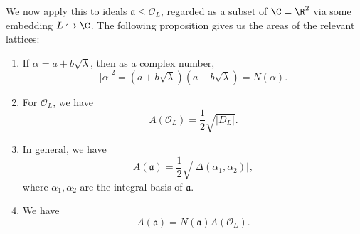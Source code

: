 \documentclass[a4paper]{article}
\begin{document}
We now apply this to ideals $\mathfrak{a} \leq \mathcal{O}_L$, regarded as a subset of $\C = \R^2$ via some embedding $L \hookrightarrow \C$. The following proposition gives us the areas of the relevant lattices:

\begin{prop}\leavevmode
  \begin{enumerate}
    \item If $\alpha = a + b\sqrt{\lambda}$, then as a complex number,
      \[
        |\alpha|^2 = (a + b\sqrt{\lambda})(a - b\sqrt{\lambda}) = N(\alpha).
      \]
    \item For $\mathcal{O}_L$, we have
      \[
        A(\mathcal{O}_L) = \frac{1}{2}\sqrt{|D_L|}.
      \]
    \item In general, we have
      \[
        A(\mathfrak{a}) = \frac{1}{2} \sqrt{|\Delta(\alpha_1, \alpha_2)|},
      \]
      where $\alpha_1, \alpha_2$ are the integral basis of $\mathfrak{a}$.
    \item We have
      \[
        A(\mathfrak{a}) = N(\mathfrak{a}) A(\mathcal{O}_L).
      \]
  \end{enumerate}
\end{prop}
\end{document}

